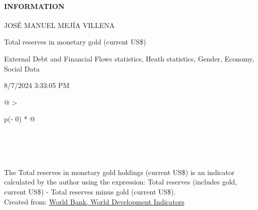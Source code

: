 \documentclass[
]{article}
\providecommand{\tightlist}{%
  \setlength{\itemsep}{0pt}\setlength{\parskip}{0pt}}
\newenvironment{LTR}{\beginL}{\endL}
\begin{document}
\begin{itemize}
  \hypertarget{infoLinkDesc}{}
  \hypertarget{information}{%
  \paragraph{\texorpdfstring{INFORMATION
  {}}{INFORMATION }}\label{information}}

  \hypertarget{reportDescription}{}
  \begin{description}
  \tightlist
  \item[Created by]
  JOSÉ MANUEL MEJÍA VILLENA
  \item[Description]
  Total reserves in monetary gold (current US\$)
  \item[Tags]
  External Debt and Financial Flows statistics, Heath statistics,
  Gender, Economy, Social Data
  \item[Last Updated]
  8/7/2024 3:33:05 PM
  \end{description}
\end{itemize}

\protect\hypertarget{fullScreen}{\href{javascript:void(0)}{}}

\begin{longtable}[]{@{}
  >{\raggedright\arraybackslash}p{(\columnwidth - 0\tabcolsep) * }@{}}
\toprule\noalign{}
\endhead
\bottomrule\noalign{}
\endlastfoot
\begin{minipage}[t]{\linewidth}\raggedright
\hypertarget{REPORT_PREVIEW_divdropdown}{}
\end{minipage} \\
 \\
\begin{minipage}[t]{\linewidth}\raggedright
\hypertarget{container}{}
\begin{LTR}
\end{LTR}
\end{minipage} \\
\protect\hypertarget{REPORT_PREVIEW_lblXAxis}{}{}
\protect\hypertarget{REPORT_PREVIEW_lblFooter}{}{The Total reserves in
monetary gold holdings (current US\$) is an indicator calculated by the
author using the expression: Total reserves (includes gold, current
US\$) - Total reserves minus gold (current US\$).} \\
\protect\hypertarget{REPORT_PREVIEW_sReportSource}{}{Created from:}
\protect\hypertarget{REPORT_PREVIEW_hplDatabaseName}{\href{javascript:Shared(\textquotesingle{}/Total-reserves-in-monetary-gold-holdings-(current-US$)---Graph/id/c95a71e2\textquotesingle{});}{World
Bank, World Development Indicators}} \\
\textbf{} \protect\hypertarget{REPORT_PREVIEW_sDisclaimerMsg}{}{ } \\
\end{longtable}
\end{document}
